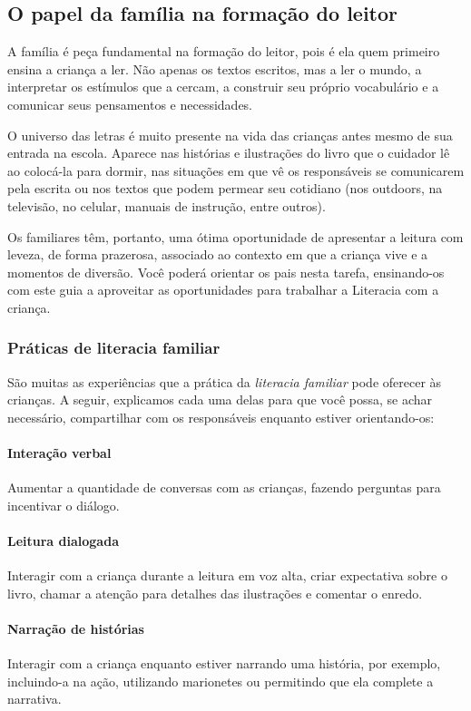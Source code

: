 \documentclass[11pt]{extarticle}
\begin{document}
\subsection{O papel da família na formação do leitor}
A família é peça fundamental na formação do leitor, pois é ela quem primeiro 
ensina a criança a ler. Não apenas os textos escritos, mas a ler o mundo, a 
interpretar os estímulos que a cercam, a construir seu próprio vocabulário e a 
comunicar seus pensamentos e necessidades.

O universo das letras é muito presente na vida das crianças antes mesmo de sua 
entrada na escola. Aparece nas histórias e ilustrações do livro que o cuidador 
lê ao colocá-la para dormir, nas situações em que vê os responsáveis se comunicarem 
pela escrita ou nos textos que podem permear seu cotidiano (nos outdoors, na 
televisão, no celular, manuais de instrução, entre outros). 

Os familiares têm, 
portanto, uma ótima oportunidade de apresentar a leitura com leveza, de forma 
prazerosa, associado ao contexto em que a criança vive e a momentos de diversão. 
Você poderá orientar os pais nesta tarefa, ensinando-os com este guia a aproveitar 
as oportunidades para trabalhar a Literacia com a criança.


\subsubsection{Práticas de literacia familiar} 

São muitas as experiências que a prática da \textit{literacia familiar} 
pode oferecer às crianças. A seguir, explicamos cada uma delas para que você possa, 
se achar necessário, compartilhar com os responsáveis enquanto estiver orientando-os: 

\paragraph{Interação verbal} Aumentar a quantidade de conversas com as 
crianças, fazendo perguntas para incentivar o diálogo.

\paragraph{Leitura dialogada} Interagir com a criança durante a leitura 
em voz alta, criar expectativa sobre o livro, chamar a atenção para detalhes 
das ilustrações e comentar o enredo.

\paragraph{Narração de histórias} Interagir com a criança enquanto 
estiver narrando uma história, por exemplo, incluindo-a na ação, utilizando 
marionetes ou permitindo que ela complete a narrativa.
\end{document}
